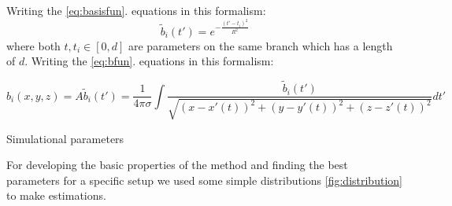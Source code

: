 \documentclass[12pt,a4paper]{article}
\begin{document}
Writing the \ref{eq:basisfun}. equations in this formalism:
\begin{equation}
\tilde{b}_i (t') = e^{- \frac{(t' - t_i)^2}{R^2}}
\end{equation}
where both $t,t_i \in \left[ 0, d \right] $ are parameters on the same branch which has a length of $d$. 
Writing the \ref{eq:bfun}. equations in this formalism:


\begin{equation}
b_i (x,y,z)= A \tilde{b}_i (t')= \frac{1}{4 \pi \sigma} \int 
\frac{ \tilde{b}_i (t')}{\sqrt{(x-x'(t))^2+(y-y'(t))^2+(z-z'(t))^2}} dt'
\end{equation}





Simulational parameters




For developing the basic properties of the method and finding the best parameters for a specific setup we used some simple distributions \ref{fig:distribution} to make estimations.
\end{document}
